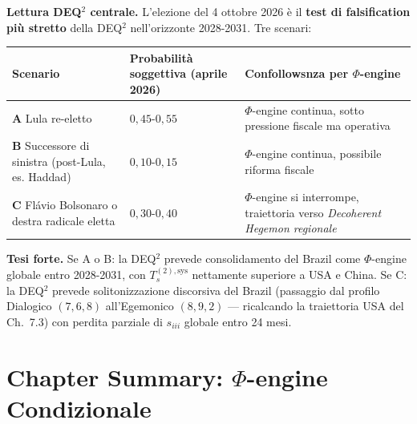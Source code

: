 \Conj{} \textbf{Lettura DEQ$^2$ centrale.} L'elezione del 4 ottobre 2026 è
il \textbf{test di falsification più stretto} della DEQ$^2$ nell'orizzonte
2028-2031. Tre scenari:

{\def\LTcaptype{none} %
{\small\begin{longtable}[]{@{}
  >{\raggedright\arraybackslash}p{}
  >{\raggedright\arraybackslash}p{}
  >{\raggedright\arraybackslash}p{}@{}}
\toprule\noalign{}
\begin{minipage}[b]{\linewidth}\raggedright
Scenario
\end{minipage} & \begin{minipage}[b]{\linewidth}\raggedright
Probabilità soggettiva (aprile 2026)
\end{minipage} & \begin{minipage}[b]{\linewidth}\raggedright
Confollowsnza per \(\Phi\)-engine
\end{minipage} \\
\midrule\noalign{}
\endhead
\bottomrule\noalign{}
\endlastfoot
\textbf{A} Lula re-eletto & \(0{,}45\)-\(0{,}55\) & \(\Phi\)-engine
continua, sotto pressione fiscale ma operativa \\
\textbf{B} Successore di sinistra (post-Lula, es. Haddad) &
\(0{,}10\)-\(0{,}15\) & \(\Phi\)-engine continua, possibile riforma
fiscale \\
\textbf{C} Flávio Bolsonaro o destra radicale eletta &
\(0{,}30\)-\(0{,}40\) & \(\Phi\)-engine si interrompe, traiettoria verso
\emph{Decoherent Hegemon regionale} \\
\end{longtable}}
}

\Hypoth{} \textbf{Tesi forte.} Se A o B: la DEQ$^2$ prevede consolidamento
del Brazil come \(\Phi\)-engine globale entro 2028-2031, con
\(T_s^{(2),\text{sys}}\) nettamente superiore a USA e China. Se C: la
DEQ$^2$ prevede solitonizzazione discorsiva del Brazil (passaggio dal
profilo Dialogico \((7,6,8)\) all'Egemonico \((8,9,2)\) --- ricalcando
la traiettoria USA del Ch.~7.3) con perdita parziale di \(s_{iii}\)
globale entro 24 mesi.



\section{\texorpdfstring{Chapter Summary: \(\Phi\)-engine
Condizionale}{Chapter Summary: \textbackslash Phi-engine Condizionale}}\label{sintesi-del-chapter-phi-engine-conditional}

